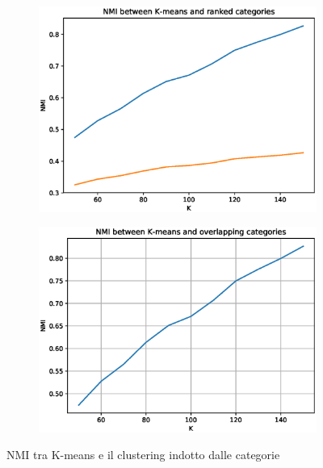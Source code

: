 \documentclass[
	11pt, %
	a4paper, %
	oneside, %
	headinclude,footinclude, %
	BCOR5mm, %
]{scrartcl}
\begin{document}
		\begin{figure}[!htbp]
			\hspace{-1cm}
			\begin{subfigure}{.5\textwidth}
				\centering
				\includegraphics[scale=.5]{../results/NMI-kmeans-ranked-categories.eps}
			\end{subfigure}
			\hspace{0.5cm}
			\begin{subfigure}{.5\textwidth}
				\centering
				\includegraphics[scale=.5]{../results/NMI-kmeans-overlapping-categories.eps}
			\end{subfigure}
			\caption{NMI tra K-means e il clustering indotto dalle categorie}
			\label{fig:NMI-kmeans-categories}
		\end{figure}
\end{document}
